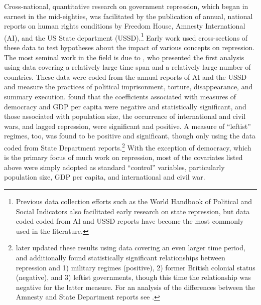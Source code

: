 \documentclass[11pt]{article}
\begin{document}
Cross-national, quantitative research on government repression, which began in earnest in the mid-eighties, was facilitated by the publication of annual, national reports on human rights conditions by Freedom House, Amnesty International (AI), and the US State department (USSD).\footnote{Previous data collection efforts such as the World Handbook of Political and Social Indicators \citep{TaylorJodice1983} also facilitated early research on state repression, but data coded coded from AI and USSD reports have become the most commonly used in the literature.} Early work used cross-sections of these data to test hypotheses about the impact of various concepts on repression. The most seminal work in the field is due to \citet{PoeTate1994}, who presented the first analysis using data covering a relatively large time span and a relatively large number of countries. These data were coded from the annual reports of AI and the USSD and measure the practices of political imprisonment, torture, disappearance, and summary execution. \citet{PoeTate1994} found that the coefficients associated with measures of democracy and GDP per capita were negative and statistically significant, and those associated with population size, the occurrence of international and civil wars, and lagged repression, were significant and positive. A measure of ``leftist'' regimes, too, was found to be positive and significant, though only using the data coded from State Department reports.\footnote{\citet{Poeetal1999} later updated these results using data covering an even larger time period, and additionally found statistically significant relationships between repression and 1) military regimes (positive), 2) former British colonial status (negative), and 3) leftist governments, though this time the relationship was negative for the latter measure. For an analysis of the differences between the Amnesty and State Department reports see \citet{Poe2001}.}  With the exception of democracy, which is the primary focus of much work on repression, most of the covariates listed above were simply adopted as standard ``control'' variables, particularly population size, GDP per capita, and international and civil war.
\end{document}
